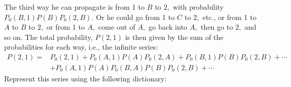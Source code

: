 The third way he can propagate is from 1 to $B$ to $2,$ with probability $P_{0}(B, 1) P(B) P_{0}(2, B) .$ Or he could go from 1 to $C$ to $2,$ etc., or from 1 to $A$ to $B$ to $2,$ or from 1 to $A,$ come out of $A,$ go back into $A,$ then go to $2,$ and so on. The total probability, $P(2,1)$ is then given by the sum of the probabilities for each way, i.e., the infinite series:
$$\begin{aligned}
P(2,1)=&P_{0}(2,1)+P_{0}(A, 1) P(A) P_{0}(2, A)+P_{0}(B, 1) P(B) P_{0}(2, B)+\cdots  \\
&+P_{0}(A, 1) P(A) P_{0}(B, A) P(B) P_{0}(2, B)+\cdots
\end{aligned}$$
 Represent this series using the following dictionary:
